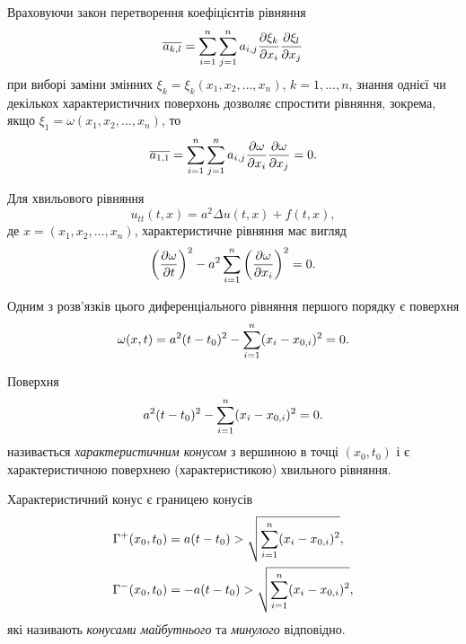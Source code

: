 Враховуючи закон перетворення коефіцієнтів рівняння
\begin{equation}
    \overline{a_{k, l}} = \displaystyle\sum\limits_{i = 1}^n \displaystyle\sum\limits_{j = 1}^n a_{i, j} \frac{\partial \xi_k}{\partial x_i} \frac{\partial \xi_l}{\partial x_j}
\end{equation}
при виборі заміни змінних $\xi_k = \xi_k(x_1, x_2, \ldots, x_n)$, $k = 1, \ldots, n$, знання однієї чи декількох характеристичних поверхонь дозволяє спростити рівняння, зокрема, якщо $\xi_1 = \omega(x_1, x_2, \ldots, x_n)$, то
\begin{equation}
    \overline{a_{1, 1}} = \displaystyle\sum\limits_{i = 1}^n \displaystyle\sum\limits_{j = 1}^n a_{i, j} \frac{\partial \omega}{\partial x_i} \frac{\partial \omega}{\partial x_j} = 0.
\end{equation}

Для хвильового рівняння
\begin{equation}
    u_{tt}(t, x) = a^2 \Delta u(t, x) + f(t, x),
\end{equation}
де $x = (x_1, x_2, \ldots, x_n)$, характеристичне рівняння має вигляд
\begin{equation}
    \left( \frac{\partial \omega}{\partial t} \right)^2 - a^2 \displaystyle\sum\limits_{i = 1}^n \left(\frac{\partial \omega}{\partial x_i} \right)^2 = 0.
\end{equation}

Одним з розв'язків цього диференціального рівняння першого порядку є поверхня
\begin{equation}
    \omega(x, t) = a^2 (t - t_0)^2 - \displaystyle\sum\limits_{i = 1}^n (x_i - x_{0, i})^2 = 0.
\end{equation}

\begin{definition}
    Поверхня
    \begin{equation}
        a^2 (t - t_0)^2 - \displaystyle\sum\limits_{i = 1}^n (x_i - x_{0, i})^2 = 0.
    \end{equation}
    називається \textit{характеристичним конусом} з вершиною в точці $(x_0, t_0)$ і є характеристичною поверхнею (характеристикою) хвильного рівняння.
\end{definition}

\begin{remark}
    Характеристичний конус є границею конусів
    \begin{align}
        \Gamma^+(x_0, t_0) &= a (t - t_0) > \sqrt{ \displaystyle\sum\limits_{i = 1}^n (x_i - x_{0, i})^2 }, \\
        \Gamma^-(x_0, t_0) &= - a (t - t_0) > \sqrt{ \displaystyle\sum\limits_{i = 1}^n (x_i - x_{0, i})^2 },
    \end{align}
    які називають \textit{конусами майбутнього} та \textit{минулого} відповідно.
\end{remark}

